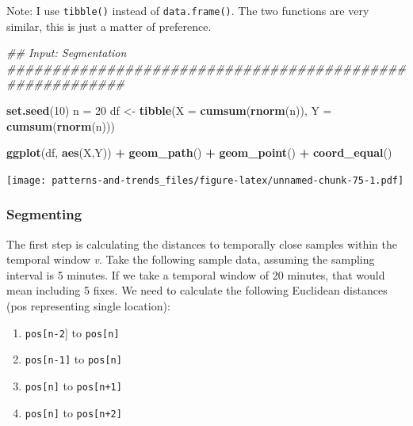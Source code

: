 \documentclass[]{book}
\newenvironment{Shaded}{\begin{snugshade}}{\end{snugshade}}
\newcommand{\CommentTok}[1]{\textcolor[rgb]{0.56,0.35,0.01}{\textit{#1}}}
\newcommand{\DataTypeTok}[1]{\textcolor[rgb]{0.13,0.29,0.53}{#1}}
\newcommand{\DecValTok}[1]{\textcolor[rgb]{0.00,0.00,0.81}{#1}}
\newcommand{\KeywordTok}[1]{\textcolor[rgb]{0.13,0.29,0.53}{\textbf{#1}}}
\newcommand{\NormalTok}[1]{#1}
\newcommand{\OperatorTok}[1]{\textcolor[rgb]{0.81,0.36,0.00}{\textbf{#1}}}
\newcommand{\StringTok}[1]{\textcolor[rgb]{0.31,0.60,0.02}{#1}}
\providecommand{\tightlist}{%
  \setlength{\itemsep}{0pt}\setlength{\parskip}{0pt}}
\begin{document}
Note: I use \texttt{tibble()} instead of \texttt{data.frame()}. The two functions are very similar, this is just a matter of preference.

\begin{Shaded}
\begin{Highlighting}[]

\CommentTok{## Input: Segmentation #########################################################}


\KeywordTok{set.seed}\NormalTok{(}\DecValTok{10}\NormalTok{)}
\NormalTok{n =}\StringTok{ }\DecValTok{20}
\NormalTok{df <-}\StringTok{ }\KeywordTok{tibble}\NormalTok{(}\DataTypeTok{X =} \KeywordTok{cumsum}\NormalTok{(}\KeywordTok{rnorm}\NormalTok{(n)), }\DataTypeTok{Y =} \KeywordTok{cumsum}\NormalTok{(}\KeywordTok{rnorm}\NormalTok{(n)))}

\KeywordTok{ggplot}\NormalTok{(df, }\KeywordTok{aes}\NormalTok{(X,Y)) }\OperatorTok{+}
\StringTok{  }\KeywordTok{geom_path}\NormalTok{() }\OperatorTok{+}\StringTok{ }
\StringTok{  }\KeywordTok{geom_point}\NormalTok{() }\OperatorTok{+}
\StringTok{  }\KeywordTok{coord_equal}\NormalTok{()}
\end{Highlighting}
\end{Shaded}

\texttt{[image: patterns-and-trends\_files/figure-latex/unnamed-chunk-75-1.pdf]}

\hypertarget{segmenting}{%
\subsubsection{Segmenting}\label{segmenting}}

The first step is calculating the distances to temporally close samples within the temporal window \emph{v}. Take the following sample data, assuming the sampling interval is 5 minutes. If we take a temporal window of 20 minutes, that would mean including 5 fixes. We need to calculate the following Euclidean distances (pos representing single location):

\begin{enumerate}
\def\labelenumi{\arabic{enumi}.}
\tightlist
\item
  \texttt{pos{[}n-2}{]} to \texttt{pos{[}n{]}}
\item
  \texttt{pos{[}n-1{]}} to \texttt{pos{[}n{]}}
\item
  \texttt{pos{[}n{]}} to \texttt{pos{[}n+1{]}}
\item
  \texttt{pos{[}n{]}} to \texttt{pos{[}n+2{]}}
\end{enumerate}
\end{document}
